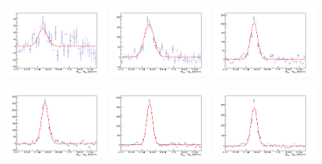 \begin{figure}[!h]
\begin{center}
\includegraphics[width=0.3\textwidth]{figures/Dstar/pp13TeV/multi_trial/residual_plot_Pow_bkg_func_1-1dot5GeV.png} 
\includegraphics[width=0.3\textwidth]{figures/Dstar/pp13TeV/multi_trial/residual_plot_Pow_bkg_func_1dot5-2GeV.png}
\includegraphics[width=0.3\textwidth]{figures/Dstar/pp13TeV/multi_trial/residual_plot_Pow_bkg_func_2-2dot5GeV.png} 

\includegraphics[width=0.3\textwidth]{figures/Dstar/pp13TeV/multi_trial/residual_plot_Pow_bkg_func_2dot5-3GeV.png} 
\includegraphics[width=0.3\textwidth]{figures/Dstar/pp13TeV/multi_trial/residual_plot_Pow_bkg_func_3-3dot5GeV.png}
\includegraphics[width=0.3\textwidth]{figures/Dstar/pp13TeV/multi_trial/residual_plot_Pow_bkg_func_3dot5-4GeV.png} 


\end{center}
\end{figure}

